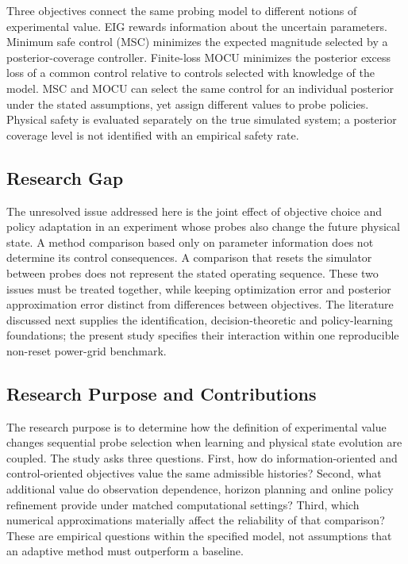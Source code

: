 \documentclass[journal]{IEEEtran}
\begin{document}
Three objectives connect the same probing model to different notions of
experimental value. EIG rewards information about the uncertain parameters.
Minimum safe control (MSC) minimizes the expected magnitude selected by a
posterior-coverage controller. Finite-loss MOCU minimizes the posterior excess
loss of a common control relative to controls selected with knowledge of the
model. MSC and MOCU can select the same control for an individual posterior
under the stated assumptions, yet assign different values to probe policies.
Physical safety is evaluated separately on the true simulated system; a
posterior coverage level is not identified with an empirical safety rate.

\subsection{Research Gap}
The unresolved issue addressed here is the joint effect of objective choice
and policy adaptation in an experiment whose probes also change the future
physical state. A method comparison based only on parameter information does
not determine its control consequences. A comparison that resets the simulator
between probes does not represent the stated operating sequence. These two
issues must be treated together, while keeping optimization error and
posterior approximation error distinct from differences between objectives.
The literature discussed next supplies the identification, decision-theoretic
and policy-learning foundations; the present study specifies their interaction
within one reproducible non-reset power-grid benchmark.

\subsection{Research Purpose and Contributions}
The research purpose is to determine how the definition of experimental value
changes sequential probe selection when learning and physical state evolution
are coupled. The study asks three questions. First, how do information-oriented
and control-oriented objectives value the same admissible histories? Second,
what additional value do observation dependence, horizon planning and online
policy refinement provide under matched computational settings? Third, which
numerical approximations materially affect the reliability of that comparison?
These are empirical questions within the specified model, not assumptions
that an adaptive method must outperform a baseline.
\end{document}
